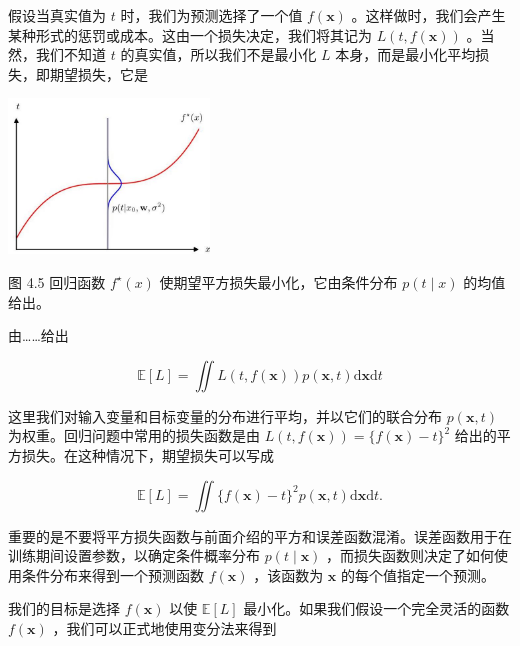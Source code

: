 \documentclass[10pt]{report}
\begin{document}
假设当真实值为 \(t\) 时，我们为预测选择了一个值 \(f\left( \mathbf{x}\right)\) 。这样做时，我们会产生某种形式的惩罚或成本。这由一个损失决定，我们将其记为 \(L\left( {t,f\left( \mathbf{x}\right) }\right)\) 。当然，我们不知道 \(t\) 的真实值，所以我们不是最小化 \(L\) 本身，而是最小化平均损失，即期望损失，它是

\begin{center}
\includegraphics[max width=0.4\textwidth]{images/0194e279-9b28-703a-88f4-c3ac21e2010d_140_931_345_610_472_0.jpg}
\end{center}
\hspace*{3em} 

图 4.5 回归函数 \({f}^{ \star  }\left( x\right)\) 使期望平方损失最小化，它由条件分布 \(p\left( {t \mid  x}\right)\) 的均值给出。

由……给出

\[
\mathbb{E}\left\lbrack  L\right\rbrack   = \iint L\left( {t,f\left( \mathbf{x}\right) }\right) p\left( {\mathbf{x},t}\right) \mathrm{d}\mathbf{x}\mathrm{d}t \tag{4.34}
\]

这里我们对输入变量和目标变量的分布进行平均，并以它们的联合分布 \(p\left( {\mathbf{x},t}\right)\) 为权重。回归问题中常用的损失函数是由 \(L\left( {t,f\left( \mathbf{x}\right) }\right)  = \{ f\left( \mathbf{x}\right)  - t{\} }^{2}\) 给出的平方损失。在这种情况下，期望损失可以写成

\[
\mathbb{E}\left\lbrack  L\right\rbrack   = \iint \{ f\left( \mathbf{x}\right)  - t{\} }^{2}p\left( {\mathbf{x},t}\right) \mathrm{d}\mathbf{x}\mathrm{d}t. \tag{4.35}
\]

重要的是不要将平方损失函数与前面介绍的平方和误差函数混淆。误差函数用于在训练期间设置参数，以确定条件概率分布 \(p\left( {t \mid  \mathbf{x}}\right)\) ，而损失函数则决定了如何使用条件分布来得到一个预测函数 \(f\left( \mathbf{x}\right)\) ，该函数为 \(\mathbf{x}\) 的每个值指定一个预测。

我们的目标是选择 \(f\left( \mathbf{x}\right)\) 以使 \(\mathbb{E}\left\lbrack  L\right\rbrack\) 最小化。如果我们假设一个完全灵活的函数 \(f\left( \mathbf{x}\right)\) ，我们可以正式地使用变分法来得到
\end{document}
